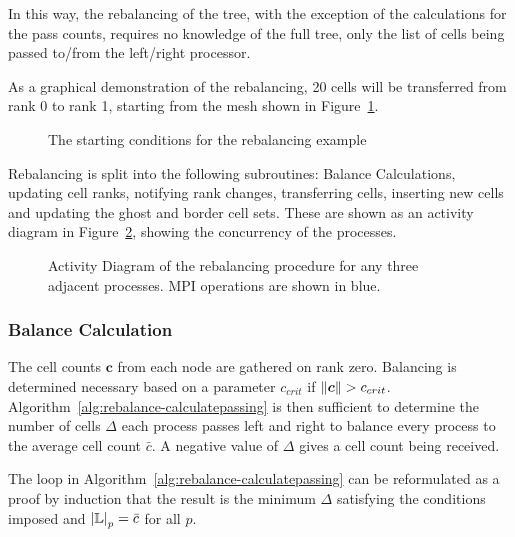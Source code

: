 \documentclass[twoside]{IIBproject}
\newcommand{\vect} [1] {\bm{#1}}
\numberwithin{figure}{section}
\begin{document}
        In this way, the rebalancing of the tree, with the exception of the calculations for the pass counts, requires no knowledge of the full tree, only the list of cells being passed to/from the left/right processor.

        As a graphical demonstration of the rebalancing, 20 cells will be transferred from rank 0 to rank 1, starting from the mesh shown in Figure~\ref{fig:rebalance-init}.

        \begin{figure}[H]
            
            \caption{The starting conditions for the rebalancing example}
            \label{fig:rebalance-init}
        \end{figure}

        Rebalancing is split into the following subroutines: Balance Calculations, updating cell ranks, notifying rank changes, transferring cells, inserting new cells and updating the ghost and border cell sets. These are shown as an activity diagram in Figure~\ref{fig:rebalance-overview}, showing the concurrency of the processes.

        \begin{figure}[H]
            
            \caption{Activity Diagram of the rebalancing procedure for any three adjacent processes. MPI operations are shown in blue.}
            \label{fig:rebalance-overview}
        \end{figure}


        \subsubsection{Balance Calculation} %
            \label{sec:rebalancing-calc}

            The cell counts $\vect{c}$ from each node are gathered on rank zero. Balancing is determined necessary based on a parameter $c_{crit}$ if $\norm{\vect{c}}>c_{crit}$. Algorithm~\ref{alg:rebalance-calculatepassing} is then sufficient to determine the number of cells $\Delta$ each process passes left and right to balance every process to the average cell count $\bar c$. A negative value of $\Delta$ gives a cell count being received.

            The loop in Algorithm~\ref{alg:rebalance-calculatepassing} can be reformulated as a proof by induction that the result is the minimum $\Delta$ satisfying the conditions imposed and $\abs{\mathbb{L}}_p=\bar c$ for all $p$.
\end{document}
